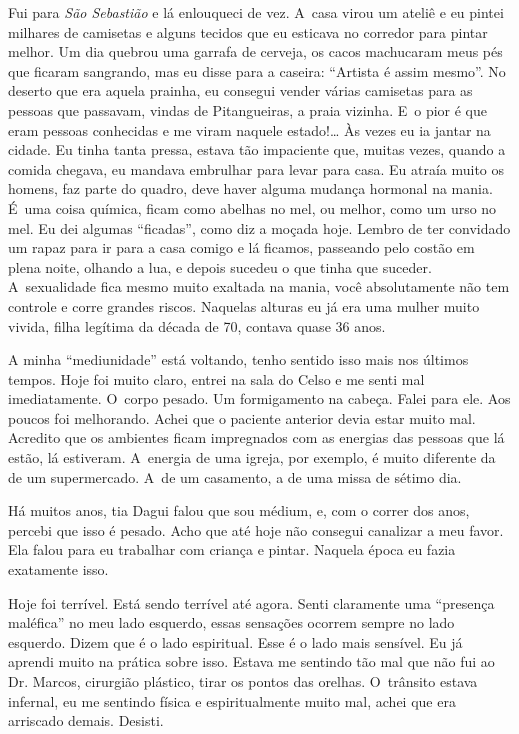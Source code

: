 Fui para \emph{São Sebastião} e lá enlouqueci de vez. A~casa virou um
ateliê e eu pintei milhares de camisetas e alguns tecidos que eu
esticava no corredor para pintar melhor. Um dia quebrou uma garrafa de
cerveja, os cacos machucaram meus pés que ficaram sangrando, mas eu
disse para a caseira: ``Artista é assim mesmo''. No deserto que era
aquela prainha, eu consegui vender várias camisetas para as pessoas que
passavam, vindas de Pitangueiras, a praia vizinha. E~o pior é que eram
pessoas conhecidas e me viram naquele estado!… Às vezes eu ia
jantar na cidade. Eu tinha tanta pressa, estava tão impaciente que,
muitas vezes, quando a comida chegava, eu mandava embrulhar para levar
para casa. Eu atraía muito os homens, faz parte do quadro, deve haver
alguma mudança hormonal na mania. É~uma coisa química, ficam como
abelhas no mel, ou melhor, como um urso no mel. Eu dei algumas
``ficadas'', como diz a moçada hoje. Lembro de ter convidado um rapaz
para ir para a casa comigo e lá ficamos, passeando pelo costão em plena
noite, olhando a lua, e depois sucedeu o que tinha que suceder. A~sexualidade fica mesmo muito exaltada na mania, você absolutamente não
tem controle e corre grandes riscos. Naquelas alturas eu já era uma
mulher muito vivida, filha legítima da década de 70, contava quase 36
anos.

A minha ``mediunidade'' está voltando, tenho sentido isso mais nos
últimos tempos. Hoje foi muito claro, entrei na sala do Celso e me senti
mal imediatamente. O~corpo pesado. Um formigamento na cabeça. Falei para
ele. Aos poucos foi melhorando. Achei que o paciente anterior devia
estar muito mal. Acredito que os ambientes ficam impregnados com as
energias das pessoas que lá estão, lá estiveram. A~energia de uma
igreja, por exemplo, é muito diferente da de um supermercado. A~de um
casamento, a de uma missa de sétimo dia.

Há muitos anos, tia Dagui falou que sou médium, e, com o correr dos
anos, percebi que isso é pesado. Acho que até hoje não consegui
canalizar a meu favor. Ela falou para eu trabalhar com criança e pintar.
Naquela época eu fazia exatamente isso.

Hoje foi terrível. Está sendo terrível até agora. Senti claramente uma
``presença maléfica'' no meu lado esquerdo, essas sensações ocorrem
sempre no lado esquerdo. Dizem que é o lado espiritual. Esse é o lado
mais sensível. Eu já aprendi muito na prática sobre isso. Estava me
sentindo tão mal que não fui ao Dr. Marcos, cirurgião plástico, tirar os
pontos das orelhas. O~trânsito estava infernal, eu me sentindo física e
espiritualmente muito mal, achei que era arriscado demais. Desisti.

